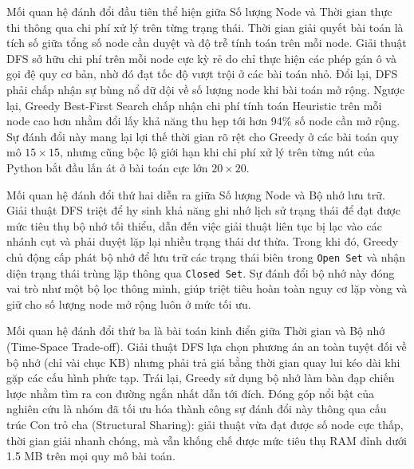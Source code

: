 \documentclass[a4paper,12pt]{article}
\begin{document}
Mối quan hệ đánh đổi đầu tiên thể hiện giữa Số lượng Node và Thời gian thực thi thông qua chi phí xử lý trên từng trạng thái. Thời gian giải quyết bài toán là tích số giữa tổng số node cần duyệt và độ trễ tính toán trên mỗi node. Giải thuật DFS sở hữu chi phí trên mỗi node cực kỳ rẻ do chỉ thực hiện các phép gán ô và gọi đệ quy cơ bản, nhờ đó đạt tốc độ vượt trội ở các bài toán nhỏ. Đổi lại, DFS phải chấp nhận sự bùng nổ dữ dội về số lượng node khi bài toán mở rộng. Ngược lại, Greedy Best-First Search chấp nhận chi phí tính toán Heuristic trên mỗi node cao hơn nhằm đổi lấy khả năng thu hẹp tới hơn 94\% số node cần mở rộng. Sự đánh đổi này mang lại lợi thế thời gian rõ rệt cho Greedy ở các bài toán quy mô $15\times 15$, nhưng cũng bộc lộ giới hạn khi chi phí xử lý trên từng nút của Python bắt đầu lấn át ở bài toán cực lớn $20\times 20$.

Mối quan hệ đánh đổi thứ hai diễn ra giữa Số lượng Node và Bộ nhớ lưu trữ. Giải thuật DFS triệt để hy sinh khả năng ghi nhớ lịch sử trạng thái để đạt được mức tiêu thụ bộ nhớ tối thiểu, dẫn đến việc giải thuật liên tục bị lạc vào các nhánh cụt và phải duyệt lặp lại nhiều trạng thái dư thừa. Trong khi đó, Greedy chủ động cấp phát bộ nhớ để lưu trữ các trạng thái biên trong \texttt{Open Set} và nhận diện trạng thái trùng lặp thông qua \texttt{Closed Set}. Sự đánh đổi bộ nhớ này đóng vai trò như một bộ lọc thông minh, giúp triệt tiêu hoàn toàn nguy cơ lặp vòng và giữ cho số lượng node mở rộng luôn ở mức tối ưu.

Mối quan hệ đánh đổi thứ ba là bài toán kinh điển giữa Thời gian và Bộ nhớ (Time-Space Trade-off). Giải thuật DFS lựa chọn phương án an toàn tuyệt đối về bộ nhớ (chỉ vài chục KB) nhưng phải trả giá bằng thời gian quay lui kéo dài khi gặp các cấu hình phức tạp. Trái lại, Greedy sử dụng bộ nhớ làm bàn đạp chiến lược nhằm tìm ra con đường ngắn nhất dẫn tới đích. Đóng góp nổi bật của nghiên cứu là nhóm đã tối ưu hóa thành công sự đánh đổi này thông qua cấu trúc Con trỏ cha (Structural Sharing): giải thuật vừa đạt được số node cực thấp, thời gian giải nhanh chóng, mà vẫn khống chế được mức tiêu thụ RAM đỉnh dưới 1.5 MB trên mọi quy mô bài toán.
\end{document}
